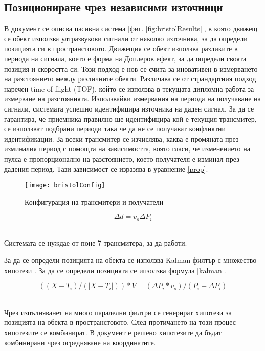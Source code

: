 \subsection{Позициониране чрез независими източници}

В документ \cite{bristolBeacons} се описва пасивна система [фиг. \ref{fig:bristolResults}], в която движещ се обект използва ултразвукови сигнали от няколко източника, за да определи позицията си в пространстовото. Движещия се обект използва разликите в периода на сигнала, което е форма на Доплеров ефект, за да определи своята позиция и скоростта си. Този подход е нов се счита за иновативен в измерването на разстоянието между различните обекти. Различава се от страндартния подход наречен time of flight (TOF), който се използва в текущата дипломна работа за измерване на разстоянията. Използвайки измервания на периода на получаване на сигнали, системата успешно идентифицира източника на даден сигнал. За да се гарантира, че приемника правилно ще идентифицира кой е текущия трансмитер, се използват подбрани периоди така че да не се получават конфликтни идентификации. За всеки трансмитер се изчислява, каква е промяната през изминалия период с помощта на зависимостта, която гласи, че изменението на пулса е пропорционално на разстоянието, което получателя е изминал през дадения период. Тази зависимост се изразява в уравнение \ref{prop}.

\begin{figure}
    \centering
    \centerline{\texttt{[image: bristolConfig]}}
    \caption{Конфигурация на трансмитери и получатели}
    \label{bristolVis}
\end{figure}


\centerline{\begin{equation} \label{prop}
    \Delta d = v_s \Delta P_i
\end{equation}} \\

Системата се нуждае от поне 7 трансмитера, за да работи. 

За да се определи позицията на обекта се използва Kalman филтър с множество хипотези \cite{kalmanFilter}. За да се определи позицията се ипзолзва формула \ref{kalman}.

\centerline{\begin{equation} \label{kalman}
    ((X-T_i)/ (|X-T_i|)) * V = (\Delta P_i * v_s) / (P_i + \Delta P_i)
\end{equation}}\\

Чрез изпълняванет на много паралелни филтри се генерират хипотези за позицията на обекта в пространстовото. След протичането на този процес хипотезите се комбинират. В документ \cite{bristolBeacons} е решено хипотезите да бъдат комбинирани чрез осредняване на координатите. \\


